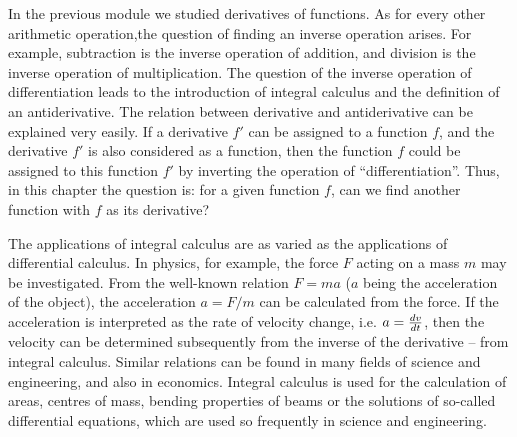 
\Mtikzexternalize
{}



\begin{MSectionStart}

\MModstartBox
\end{MSectionStart}


\begin{MIntro}

In the previous module we studied derivatives of functions. 
As for every other arithmetic operation,the question of finding an inverse operation arises. For example, subtraction is the inverse operation of addition, and division is the inverse operation of 
multiplication. The question of the inverse operation of differentiation leads
to the introduction of integral calculus and the definition of an
antiderivative. The relation between derivative and antiderivative can be explained 
very easily. If a derivative $f'$ can be assigned to a function $f$, and the derivative 
$f'$ is also considered as a function, then the function $f$ could be assigned to this function 
$f'$ by inverting the operation of ``differentiation''. Thus, in this 
chapter the question is: for a given function $f$, can we find another function 
with $f$ as its derivative? 

The applications of integral calculus are as varied as the applications of 
differential calculus. In physics, for example, the force $F$ acting on a mass $m$ may be investigated. From the well-known relation $F = m a$ ($a$ 
being the acceleration of the object), the acceleration $a = F/m$ can be calculated 
from the force. If the acceleration is interpreted as the rate of velocity change, i.e.
$a = \frac{d v}{d t}$, then the velocity can be determined subsequently from the inverse 
of the derivative -- from integral calculus. Similar relations can be found 
in many fields of science and engineering, and also in economics. Integral 
calculus is used for the calculation of areas, centres of mass, bending
properties of beams or the solutions of so-called differential equations,
which are used so frequently in science and engineering.
\end{MIntro}

